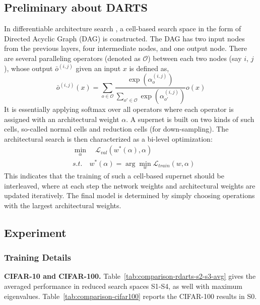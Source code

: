 \documentclass{article} \usepackage{iclr2021_conference,times}
\begin{document}
\subsection{Preliminary about DARTS}\label{app:prelim}
In differentiable architecture search \citep{liu2018darts}, a cell-based search space in the form of Directed Acyclic Graph (DAG) is constructed. The DAG has two input nodes from the previous layers, four intermediate nodes, and one output node. There are several paralleling operators (denoted as $\mathcal{O}$) between each two nodes (say $i$, $j$), whose output $\bar{o}^{(i,j)}$ given an input $x$ is defined as,
\begin{equation}\label{eq:darts-node-softmax}
\bar{o}^{(i,j)}(x) = \sum_{o \in \mathcal{O}} \frac{\exp(\alpha_{o}^{(i,j)})}{\sum_{o' \in \mathcal{O}} \exp(\alpha_{o'}^{(i,j)})} o(x)
\end{equation}
It is essentially applying softmax over all operators where each operator is assigned with an architectural weight $\alpha$. A supernet is built on two kinds of such cells, so-called normal cells and reduction cells (for down-sampling). The architectural search is then characterized as a bi-level optimization:
\begin{align}\label{eq:darts-bi-level-opt}
&\min_{\alpha} \quad \mathcal{L}_{val} (w^*(\alpha), \alpha) \\
&s.t. \quad w^*(\alpha) = \arg \min_w \mathcal{L}_{train} (w,\alpha)
\end{align}
This indicates that the training of such a cell-based supernet should be interleaved, where at each step the network weights and architectural weights are updated iteratively. The final model is determined by simply choosing operations with the largest architectural weights.



\subsection{Experiment}

\subsubsection{Training Details}\label{app:train}

\textbf{CIFAR-10 and CIFAR-100.} Table~\ref{tab:comparison-rdarts-s2-s3-avg} gives the averaged performance in reduced search spaces S1-S4, as well with maximum eigenvalues. Table~\ref{tab:comparison-cifar100} reports the CIFAR-100 results in S0. 
\end{document}
